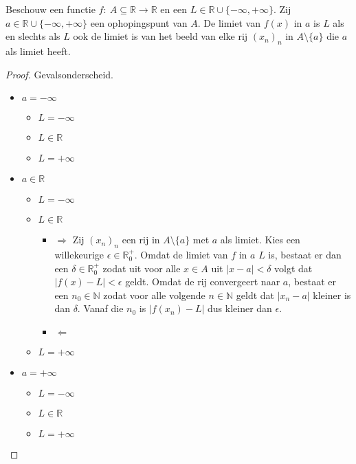 \documentclass[main.tex]{subfiles}
\begin{document}
\begin{pr}
  \label{pr:limiet-van-functie-asa-limiet-van-beeld-van-rij}
  Beschouw een functie $f:\ A \subseteq \mathbb{R} \rightarrow \mathbb{R}$ en een $L \in \mathbb{R} \cup \{-\infty,+\infty\}$.
  Zij $a \in \mathbb{R} \cup \{-\infty,+\infty\}$ een ophopingspunt van $A$.
  De limiet van $f(x)$ in $a$ is $L$ als en slechts als $L$ ook de limiet is van het beeld van elke rij $(x_{n})_{n}$ in $A\setminus\{a\}$ die $a$ als limiet heeft.

  \begin{proof}
    Gevalsonderscheid.
    \begin{itemize}
    \item $a = -\infty$
      \begin{itemize}
      \item $L = -\infty$
      \item $L \in \mathbb{R}$
      \item $L = +\infty$
      \end{itemize}
    \item $a\in\mathbb{R}$
      \begin{itemize}
      \item $L = -\infty$
      \item $L \in \mathbb{R}$
        \begin{itemize}
        \item $\Rightarrow$
          Zij $(x_{n})_{n}$ een rij in $A\setminus \{a\}$ met $a$ als limiet.
          Kies een willekeurige $\epsilon \in \mathbb{R}_{0}^{+}$.
          Omdat de limiet van $f$ in $a$ $L$ is, bestaat er dan een $\delta \in \mathbb{R}_{0}^{+}$ zodat uit voor alle $x\in A$ uit $|x-a|<\delta$ volgt dat $|f(x)-L|<\epsilon$ geldt.
          Omdat de rij convergeert naar $a$, bestaat er een $n_{0}\in \mathbb{N}$ zodat voor alle volgende $n\in\mathbb{N}$ geldt dat $|x_{n}-a|$ kleiner is dan $\delta$.
          Vanaf die $n_{0}$ is $|f(x_{n})-L|$ dus kleiner dan $\epsilon$.
        \item $\Leftarrow$
        \end{itemize}
      \item $L = +\infty$
      \end{itemize}
    \item $a = +\infty$
      \begin{itemize}
      \item $L = -\infty$
      \item $L \in \mathbb{R}$
      \item $L = +\infty$
      \end{itemize}
    \end{itemize}
  \end{proof}
\end{pr}
\end{document}
